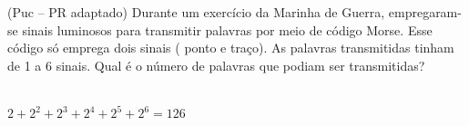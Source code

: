 \begin{ex}
 (Puc – PR adaptado) Durante um exercício da Marinha de Guerra, empregaram-se sinais luminosos para transmitir palavras por meio de código Morse. Esse código só emprega dois sinais ( ponto e traço). As palavras transmitidas tinham de 1 a 6 sinais. Qual é o número de palavras que podiam ser transmitidas?
   \begin{sol}
     \phantom{A} \\
     $2+2^2+2^3+2^4+2^5+2^6=126$
   \end{sol}
\end{ex}